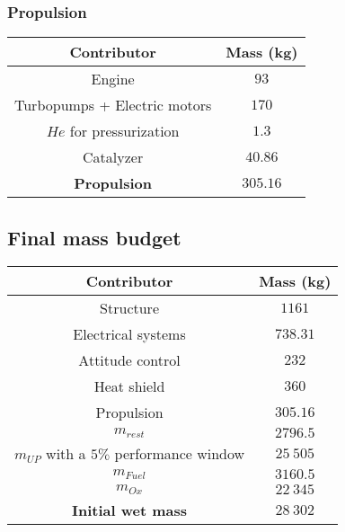 \subsubsection{Propulsion}
\begin{center}
\begin{tabular}[H]{|c|c|}
	\hline
	\cellcolor{gray!50}Contributor & \cellcolor{gray!50}Mass (kg)\\
	\hline
	Engine & $93$\\
	\hline
	Turbopumps + Electric motors & $170$\\
	\hline
	$He$ for pressurization & $1.3$\\
	\hline
	Catalyzer & $40.86$\\
	\hline
	\cellcolor{green!30}\textbf{Propulsion} & \textbf{$305.16$}\\
	\hline
\end{tabular}
\end{center}
\subsection{Final mass budget}
\begin{center}
\begin{tabular}[H]{|c|c|}
	\hline
	\cellcolor{gray!50}Contributor & \cellcolor{gray!50}Mass (kg)\\
	\hline
	Structure & $1161$\\
	\hline
	Electrical systems & $738.31$\\
	\hline
	Attitude control & $232$\\
	\hline
	Heat shield & $360$\\
	\hline
	Propulsion & $305.16$\\
	\hline
	\cellcolor{green!30}\textbf{$m_{rest}$} & \textbf{$2796.5$}\\
	\hline
	\cellcolor{green!30}\textbf{$m_{UP}$} with a $5\%$ performance window & \textbf{$25\ 505$}\\
	\hline
	\cellcolor{green!30}\textbf{$m_{Fuel}$}  & \textbf{$3160. 5$}\\
	\hline
	\cellcolor{green!30}\textbf{$m_{Ox}$}  & \textbf{$22\ 345$}\\
	\hline
	\cellcolor{red!30}\textbf{Initial wet mass}  & \textbf{$28\ 302$}\\
	\hline
\end{tabular}
\end{center}